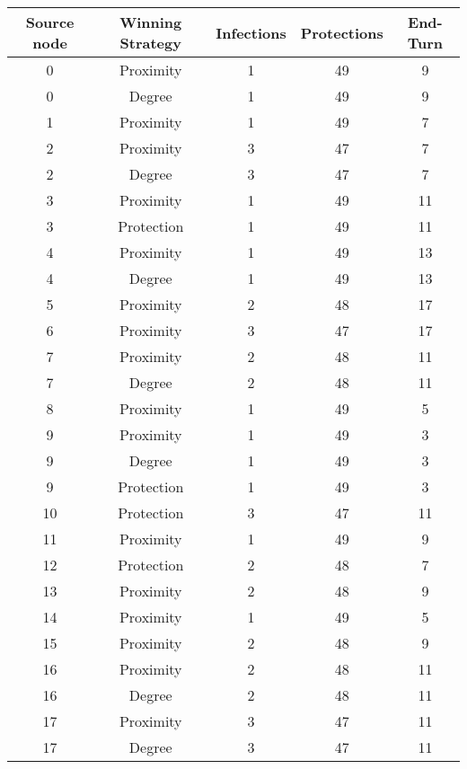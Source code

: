 \documentclass[results.tex]{subfiles}
\begin{document}
\begin{center}
  \begin{tabular}{| c || c | c | c | c |}
    \hline
    {\bfseries Source node} & {\bfseries Winning Strategy} & {\bfseries Infections} & {\bfseries Protections} & {\bfseries End-Turn} \\  %
    \hline\hline
    0 & Proximity & 1 & 49 & 9 \\ 
    \hline
    0 & Degree & 1 & 49 & 9 \\ 
    \hline
    1 & Proximity & 1 & 49 & 7 \\ 
    \hline
    2 & Proximity & 3 & 47 & 7 \\ 
    \hline
    2 & Degree & 3 & 47 & 7 \\ 
    \hline
    3 & Proximity & 1 & 49 & 11 \\ 
    \hline
    3 & Protection & 1 & 49 & 11 \\ 
    \hline
    4 & Proximity & 1 & 49 & 13 \\ 
    \hline
    4 & Degree & 1 & 49 & 13 \\ 
    \hline
    5 & Proximity & 2 & 48 & 17 \\ 
    \hline
    6 & Proximity & 3 & 47 & 17 \\ 
    \hline
    7 & Proximity & 2 & 48 & 11 \\ 
    \hline
    7 & Degree & 2 & 48 & 11 \\ 
    \hline
    8 & Proximity & 1 & 49 & 5 \\ 
    \hline
    9 & Proximity & 1 & 49 & 3 \\ 
    \hline
    9 & Degree & 1 & 49 & 3 \\ 
    \hline
    9 & Protection & 1 & 49 & 3 \\ 
    \hline
    10 & Protection & 3 & 47 & 11 \\ 
    \hline
    11 & Proximity & 1 & 49 & 9 \\ 
    \hline
    12 & Protection & 2 & 48 & 7 \\ 
    \hline
    13 & Proximity & 2 & 48 & 9 \\ 
    \hline
    14 & Proximity & 1 & 49 & 5 \\ 
    \hline
    15 & Proximity & 2 & 48 & 9 \\ 
    \hline
    16 & Proximity & 2 & 48 & 11 \\ 
    \hline
    16 & Degree & 2 & 48 & 11 \\ 
    \hline
    17 & Proximity & 3 & 47 & 11 \\ 
    \hline
    17 & Degree & 3 & 47 & 11 \\ 

\end{tabular}
\end{center}
\end{document}
